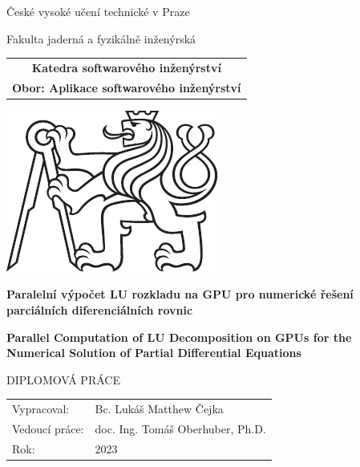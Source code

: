 \documentclass[a4paper, twoside, 11pt, czech, american]{book} %
\newcommand{\cvut}{České vysoké učení technické v Praze}
\newcommand{\fjfi}{Fakulta jaderná a fyzikálně inženýrská}
\newcommand{\ksi}{Katedra softwarového inženýrství}
\newcommand{\specialization}{Aplikace softwarového inženýrství}
\newcommand{\kind}{Diplomová práce}
\newcommand{\logoCVUT}{\includegraphics{images/title/cvut_logo_contour_version.pdf}}
\newcommand{\titleCZ}{Paralelní výpočet LU rozkladu na GPU pro numerické řešení parciálních diferenciálních rovnic}					 %
\newcommand{\titleEN}{Parallel Computation of LU Decomposition on GPUs for the Numerical Solution of Partial Differential Equations} %
\newcommand{\paperAuthor}{Bc. Lukáš Matthew Čejka}   		 %
\newcommand{\supervisor}{doc. Ing. Tomáš Oberhuber, Ph.D.} 	 %
\newcommand{\yearSubmitted}{2023}  							 %
\begin{document}
\shorthandoff{-} %




\thispagestyle{empty}
%

\begin{center}
	{\LARGE
		\cvut\par
		\fjfi
	}
	\vspace{10mm}
	
	\begin{tabular}{c}
		\textbf{\ksi} \\[3pt]   
		\textbf{Obor: \specialization}\\
	\end{tabular}
	
	\vspace{10mm} \logoCVUT \vspace{15mm} 
	
	{\huge \textbf{\titleCZ}\par}
	\vspace{5mm}
	{\huge \textbf{\titleEN}\par}
	
	\vspace{15mm}
	{\Large \MakeUppercase{\kind}}
	
	\vfill
	{\large
		\begin{tabular}{ll}
			Vypracoval: & \paperAuthor\\
			Vedoucí práce: & \supervisor\\
			Rok: & \yearSubmitted
		\end{tabular}
	}
\end{center}

\clearpage{\pagestyle{empty}\cleardoublepage} %




\newpage  			  %
\thispagestyle{empty} %






\newpage 			  %
\thispagestyle{empty} %


\end{document}

